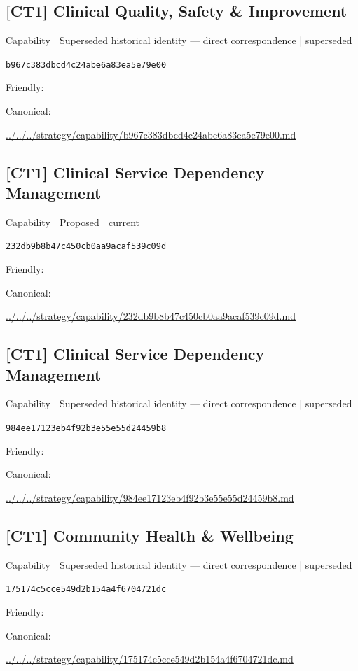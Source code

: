 \documentclass[10pt,a4paper]{article}
\begin{document}
\subsection*{[CT1] Clinical Quality, Safety \& Improvement}
{\small Capability | Superseded historical identity — direct correspondence | superseded}\par
\texttt{b967c383dbcd4c24abe6a83ea5e79e00}\par
Friendly: \par
Canonical: \par
{\footnotesize\url{../../../strategy/capability/b967c383dbcd4c24abe6a83ea5e79e00.md}}\par
\subsection*{[CT1] Clinical Service Dependency Management}
{\small Capability | Proposed | current}\par
\texttt{232db9b8b47c450cb0aa9acaf539c09d}\par
Friendly: \par
Canonical: \par
{\footnotesize\url{../../../strategy/capability/232db9b8b47c450cb0aa9acaf539c09d.md}}\par
\subsection*{[CT1] Clinical Service Dependency Management}
{\small Capability | Superseded historical identity — direct correspondence | superseded}\par
\texttt{984ee17123eb4f92b3e55e55d24459b8}\par
Friendly: \par
Canonical: \par
{\footnotesize\url{../../../strategy/capability/984ee17123eb4f92b3e55e55d24459b8.md}}\par
\subsection*{[CT1] Community Health \& Wellbeing}
{\small Capability | Superseded historical identity — direct correspondence | superseded}\par
\texttt{175174c5cce549d2b154a4f6704721dc}\par
Friendly: \par
Canonical: \par
{\footnotesize\url{../../../strategy/capability/175174c5cce549d2b154a4f6704721dc.md}}\par
\end{document}
